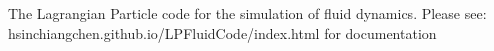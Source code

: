 The Lagrangian Particle code for the simulation of fluid dynamics. Please see\-: hsinchiangchen.\-github.\-io/\-L\-P\-Fluid\-Code/index.html for documentation 